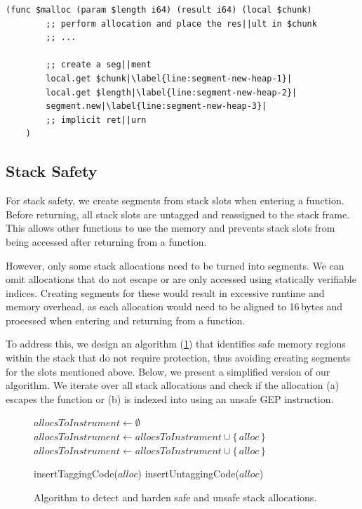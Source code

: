 \begin{lstfloat}
    \begin{lstlisting}[frame=h,style=customwasm,
        label={lst:wasm-allocator-example-inner},escapechar=|]
    (func $malloc (param $length i64) (result i64) (local $chunk)
        ;; perform allocation and place the res||ult in $chunk
        ;; ...

        ;; create a seg||ment
        local.get $chunk|\label{line:segment-new-heap-1}|
        local.get $length|\label{line:segment-new-heap-2}|
        segment.new|\label{line:segment-new-heap-3}|
        ;; implicit ret||urn
    )
    \end{lstlisting}
    \caption{Generated \ac{WASM} for code from \cref{lst:heap-allocator-example}.}
    \label{lst:wasm-allocator-example}
\end{lstfloat}

\subsection{Stack Safety}
\label{subsec:stack-safety}

For stack safety, we create segments from stack slots when entering a function.
Before returning, all stack slots are untagged and reassigned to the stack frame.
This allows other functions to use the memory and prevents stack slots from being accessed after returning from a function.

However, only some stack allocations need to be turned into segments.
We can omit allocations that do not escape or are only accessed using statically verifiable indices.
Creating segments for these would result in excessive runtime and memory overhead, as each allocation would need to be aligned to 16\,bytes and processed when entering and returning from a function.

To address this, we design an algorithm (\cref{fig:stack-safety-pseudo}) that identifies safe memory regions within the stack that do not require protection, thus avoiding creating segments for the slots mentioned above.
Below, we present a simplified version of our algorithm.
We iterate over all stack allocations and check if the allocation (a) escapes the function or (b) is indexed into using an unsafe \ac{GEP} instruction.

\begin{figure}
    \begin{algorithmic}
        \State $allocsToInstrument \gets \emptyset$
                \State $allocsToInstrument \gets allocsToInstrument \cup \{\,alloc\,\}$
            \State $allocsToInstrument \gets allocsToInstrument \cup \{\,alloc\,\}$
            \EndIf
        \EndFor

            \State insertTaggingCode($alloc$)
            \State insertUntaggingCode($alloc$)
        \EndFor
    \end{algorithmic}
    \caption{Algorithm to detect and harden safe and unsafe stack allocations.}
    \label{fig:stack-safety-pseudo}
\end{figure}

